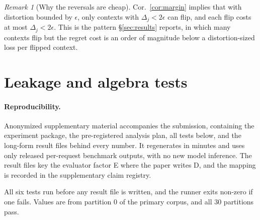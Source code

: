 \documentclass{article}
\theoremstyle{plain}
\theoremstyle{remark}
\newtheorem{remark}[proposition]{Remark}
\begin{document}
\begin{remark}[Why the reversals are cheap]\label{rem:cheap}
Cor.~\ref{cor:margin} implies that with distortion bounded by $\epsilon$, only contexts with
$\Delta_j<2\epsilon$ can flip, and each flip costs at most $\Delta_j<2\epsilon$. This is the pattern
\S\ref{sec:results} reports, in which many contexts flip but the regret cost is an order of magnitude
below a distortion-sized loss per flipped context.
\end{remark}

\section{Leakage and algebra tests}\label{app:tests}
\paragraph{Reproducibility.} Anonymized supplementary material accompanies the submission, containing
the experiment package, the pre-registered analysis plan, all tests below, and the long-form result
files behind every number. It regenerates in minutes and uses only released per-request benchmark
outputs, with no new model inference. The result files key the evaluator factor E where the paper
writes D, and the mapping is recorded in the supplementary claim registry.

All six tests run before any result file is written, and the runner exits non-zero if one fails.
Values are from partition $0$ of the primary corpus, and all $30$ partitions pass.
\end{document}
